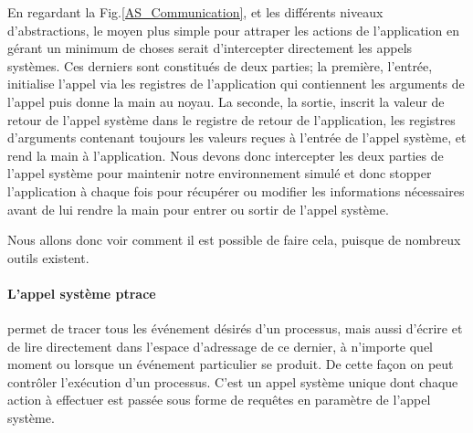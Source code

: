 En regardant la Fig.\ref{AS_Communication}, et les différents niveaux
d'abstractions, le moyen plus simple pour attraper les actions de l'application
en gérant un minimum de choses serait d'intercepter directement les appels
systèmes.  Ces derniers sont constitués de deux parties; la première, l'entrée,
initialise l'appel via les registres de l'application qui contiennent les
arguments de l'appel puis donne la main au noyau. La seconde, la sortie, inscrit
la valeur de retour de l'appel système dans le registre de retour de
l'application, les registres d'arguments contenant toujours les valeurs reçues à
l'entrée de l'appel système, et rend la main à l'application. Nous devons donc
intercepter les deux parties de l'appel système pour maintenir notre
environnement simulé et donc stopper l'application à chaque fois pour récupérer
ou modifier les informations nécessaires avant de lui rendre la main pour entrer
ou sortir de l'appel système.

 Nous allons donc voir comment il est possible de faire cela, puisque de
 nombreux outils existent.
 
 \paragraph{L'appel système ptrace}\cite{INTERCEPTION:AS, INTERCEPTION:MARION}
 permet de tracer tous les événement désirés d'un processus, mais aussi d'écrire
 et de lire directement dans l'espace d'adressage de ce dernier, à n'importe
 quel moment ou lorsque un événement particulier se produit. De cette façon on
 peut contrôler l'exécution d'un processus. C'est un appel système unique dont
 chaque action à effectuer est passée sous forme de requêtes en paramètre de
 l'appel système.

